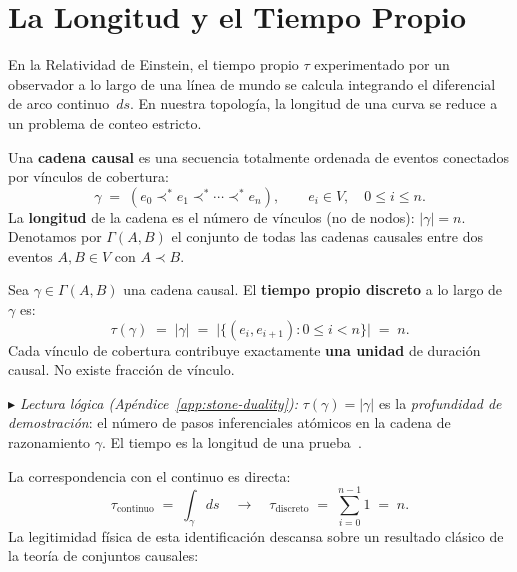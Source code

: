 \documentclass[11pt, a4paper, openany]{book}
\newcommand{\covers}{\prec^{\!*}}
\newcommand{\stoneref}[1]{%
  \smallskip\noindent
  {\small\color{structure!70}\textit{$\blacktriangleright$ Lectura
  l\'ogica (Ap\'endice~\ref{app:stone-duality}):} #1}%
  \smallskip}
\begin{document}
\section{La Longitud y el Tiempo Propio}

En la Relatividad de Einstein, el tiempo propio $\tau$ experimentado
por un observador a lo largo de una l\'inea de mundo se calcula
integrando el diferencial de arco continuo~$ds$. En nuestra
topolog\'ia, la longitud de una curva se reduce a un problema de
conteo estricto.

\begin{definition}
\label{def:chain}
Una \textbf{cadena causal} es una secuencia totalmente ordenada de
eventos conectados por v\'inculos de cobertura:
\[
  \gamma \;=\; (e_0 \covers e_1 \covers \cdots \covers e_n),
  \qquad e_i \in V,\quad 0 \le i \le n.
\]
La \textbf{longitud} de la cadena es el n\'umero de v\'inculos (no de
nodos): $|\gamma| = n$. Denotamos por $\Gamma(A,B)$ el conjunto de
todas las cadenas causales entre dos eventos $A, B \in V$ con
$A \prec B$.
\end{definition}

\begin{definition}
\label{def:proper-time}
Sea $\gamma \in \Gamma(A,B)$ una cadena causal. El \textbf{tiempo
propio discreto} a lo largo de~$\gamma$ es:
\begin{equation}
  \tau(\gamma) \;=\; |\gamma|
  \;=\; \bigl|\{(e_i, e_{i+1}) : 0 \le i < n\}\bigr|
  \;=\; n.
  \label{eq:proper-time}
\end{equation}
Cada v\'inculo de cobertura contribuye exactamente \textbf{una
unidad} de duraci\'on causal. No existe fracci\'on de v\'inculo.
\end{definition}

\stoneref{$\tau(\gamma) = |\gamma|$ es la \emph{profundidad de
demostraci\'on}: el n\'umero de pasos inferenciales at\'omicos en la
cadena de razonamiento $\gamma$. El tiempo es la longitud de una
prueba~\cite{prawitz1965}.}

\noindent
La correspondencia con el continuo es directa:
\[
  \tau_{\text{continuo}}
  \;=\; \int_\gamma ds
  \quad\longrightarrow\quad
  \tau_{\text{discreto}}
  \;=\; \sum_{i=0}^{n-1} 1
  \;=\; n.
\]
La legitimidad f\'isica de esta identificaci\'on descansa sobre un
resultado cl\'asico de la teor\'ia de conjuntos causales:
\end{document}
